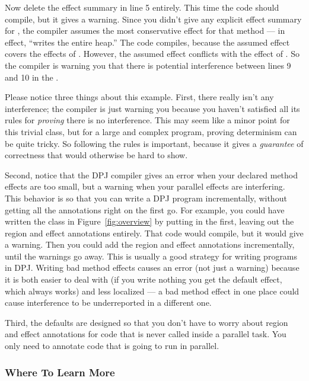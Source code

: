 Now delete the effect summary in line 5 entirely.  This time the
code should compile, but it gives a warning.  Since you didn't give
any explicit effect summary for , the compiler assumes the
most conservative effect for that method --- in effect, ``writes the
entire heap.''  The code compiles, because the assumed effect
covers the effects of .  However, the assumed effect
conflicts with the effect  of .  So the
compiler is warning you that there is potential interference between
lines 9 and 10 in the .

Please notice three things about this example.  First, there really
isn't any interference; the compiler is just warning you because you
haven't satisfied all its rules for \emph{proving} there is no
interference.  This may seem like a minor point for this trivial
class, but for a large and complex program, proving determinism can be
quite tricky.  So following the rules is important, because it gives a
\emph{guarantee} of correctness that would otherwise be hard to show.

Second, notice that the DPJ compiler gives an error when your declared
method effects are too small, but a warning when your parallel effects
are interfering.  This behavior is so that you can write a DPJ program
incrementally, without getting all the annotations right on the first
go.  For example, you could have written the class in
Figure~\ref{fig:overview} by putting in the  first,
leaving out the region and effect annotations entirely.  That code
would compile, but it would give a warning.  Then you could add the
region and effect annotations incrementally, until the warnings go
away.  This is usually a good strategy for writing programs in DPJ.
Writing bad method effects causes an error (not just a warning)
because it is both easier to deal with (if you write nothing you get
the default effect, which always works) and less localized --- a bad
method effect in one place could cause interference to be
underreported in a different one.

Third, the defaults are designed so that you don't have to worry about
region and effect annotations for code that is never called inside a
parallel task.  You only need to annotate code that is going to run in
parallel.

\subsubsection{Where To Learn More%
\label{sec:overview:basic:where-tolearn}}

